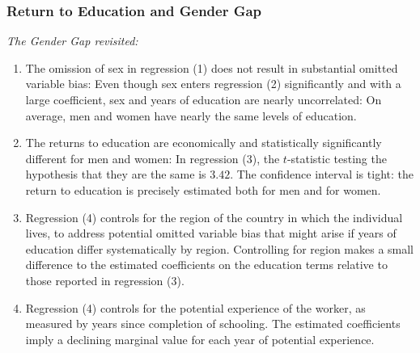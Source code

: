 \begin{frame}
\frametitle{Return to Education and Gender Gap}
\emph{The Gender Gap revisited:}
\begin{enumerate}
\item The omission of sex in regression (1) does not result in substantial omitted variable bias: Even though sex enters regression (2) significantly and with a large coefficient, sex and years of education are nearly uncorrelated: On average, men and women have nearly the same levels of education. 
\item The returns to education are economically and statistically significantly different for men and women: In regression (3), the $t$-statistic testing the hypothesis that they are the same is $3.42$. The confidence interval is tight: the return to education is precisely estimated both for men and for women.
\item Regression (4) controls for the region of the country in which the individual lives, to address potential omitted variable bias that might arise if years of education differ systematically by region. Controlling for region makes a small difference to the estimated coefficients on the education terms relative to those reported in regression (3). 
\item Regression (4) controls for the potential experience of the worker, as measured by years since completion of schooling. The estimated coefficients imply a declining marginal value for each year of potential experience.
\end{enumerate}
\end{frame}

